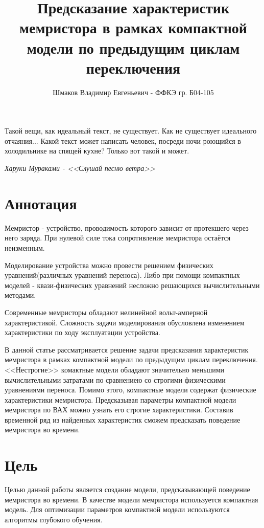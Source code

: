 \documentclass[a4paper]{article}
\title{\textcolor{main_title}{Предсказание характеристик мемристора в рамках компактной модели по предыдущим циклам переключения}}
\author{Шмаков Владимир Евгеньевич - ФФКЭ гр. Б04-105}
\begin{document}
\maketitle

\epigraph{Такой вещи, как идеальный текст, не существует. Как не существует идеального отчаяния... \newline
Какой текст может написать человек, посреди ночи роющийся в холодильнике на спящей кухне? Только вот такой и может.}{\textit{Харуки Мураками - <<Слушай песню ветра>>}}
\blindtext


\section*{\textcolor{header}{Аннотация}}

\textcolor{defenition}{Мемристор} - устройство, проводимость которого зависит от протекшего через него заряда. При нулевой силе тока сопротивление мемристора остаётся неизменным. 




Моделирование устройства можно провести решением физических уравнений(различных уравнений переноса). 
Либо при помощи \textcolor{defenition}{компактных моделей} - квази-физических уравнений несложно решающихся вычислительными методами.



Современные мемристоры обладают нелинейной вольт-амперной характеристикой. 
Сложность задачи моделирования обусловлена изменением характеристики по ходу эксплуатации устройства.

В данной статье рассматривается решение задачи предсказания характеристик мемристора в рамках компактной модели по предыдущим циклам переключения. <<Нестрогие>> комактные модели обладают значительно меньшими вычислительными затратами по сравнениею со строгими физическими уравнениями переноса. Помимо этого, компактные модели содержат физические характеристики мемристора. Предсказывая параметры компактной модели мемристора по ВАХ можно узнать его строгие характеристики. Составив временной ряд из найденных характеристик сможем предсказать поведение мемристора во времени. 

\section*{\textcolor{header}{Цель}}


Целью данной работы является создание модели, предсказывающей поведение мемристора во времени. 
В качестве модели мемристора используется компактная модель. 
Для оптимизации параметров компактной модели используются алгоритмы глубокого обучения.
\end{document}
